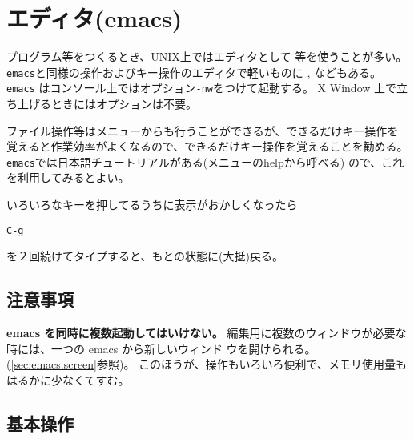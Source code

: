 \documentclass{jreport}
\begin{document}


\chapter{エディタ(emacs)}

プログラム等をつくるとき、UNIX上ではエディタとして 
等を使うことが多い。
\verb|emacs|と同様の操作およびキー操作のエディタで軽いものに 
, などもある。
\verb|emacs| はコンソール上ではオプション\verb|-nw|をつけて起動する。
X Window 上で立ち上げるときにはオプションは不要。

ファイル操作等はメニューからも行うことができるが、できるだけキー操作を
覚えると作業効率がよくなるので、できるだけキー操作を覚えることを勧める。
\verb|emacs|では日本語チュートリアルがある(メニューのhelpから呼べる)
ので、これを利用してみるとよい。

いろいろなキーを押してるうちに表示がおかしくなったら
\begin{screen}
\begin{verbatim}
C-g
\end{verbatim}
\end{screen}
を２回続けてタイプすると、もとの状態に(大抵)戻る。

\section{注意事項}

\textbf{emacs を同時に複数起動してはいけない。}
編集用に複数のウィンドウが必要な時には、一つの emacs から新しいウィンド
ウを開けられる。
(\ref{sec:emacs.screen}参照)。
このほうが、操作もいろいろ便利で、メモリ使用量もはるかに少なくてすむ。

\section{基本操作}
\end{document}
